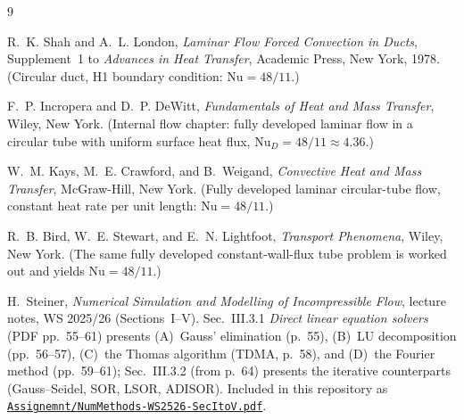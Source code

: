 \documentclass[12pt,a4paper]{article}
\begin{document}
\begin{thebibliography}{9}

R.~K. Shah and A.~L. London,
\emph{Laminar Flow Forced Convection in Ducts},
Supplement~1 to \emph{Advances in Heat Transfer}, Academic Press, New York, 1978.
(Circular duct, H1 boundary condition: $\text{Nu} = 48/11$.)

F.~P. Incropera and D.~P. DeWitt,
\emph{Fundamentals of Heat and Mass Transfer},
Wiley, New York.
(Internal flow chapter: fully developed laminar flow in a circular tube with uniform surface
heat flux, $\text{Nu}_D = 48/11 \approx 4.36$.)

W.~M. Kays, M.~E. Crawford, and B.~Weigand,
\emph{Convective Heat and Mass Transfer},
McGraw-Hill, New York.
(Fully developed laminar circular-tube flow, constant heat rate per unit length:
$\text{Nu} = 48/11$.)

R.~B. Bird, W.~E. Stewart, and E.~N. Lightfoot,
\emph{Transport Phenomena},
Wiley, New York.
(The same fully developed constant-wall-flux tube problem is worked out and yields
$\text{Nu} = 48/11$.)

H.~Steiner,
\emph{Numerical Simulation and Modelling of Incompressible Flow},
lecture notes, WS 2025/26 (Sections~I--V).
Sec.~III.3.1 \emph{Direct linear equation solvers} (PDF pp.~55--61) presents
(A)~Gauss' elimination (p.~55), (B)~LU decomposition (pp.~56--57), (C)~the Thomas
algorithm (TDMA, p.~58), and (D)~the Fourier method (pp.~59--61);
Sec.~III.3.2 (from p.~64) presents the iterative counterparts (Gauss--Seidel, SOR,
LSOR, ADISOR).
Included in this repository as
\href{../Assignemnt/NumMethods-WS2526-SecItoV.pdf}{\texttt{Assignemnt/NumMethods-WS2526-SecItoV.pdf}}.

\end{thebibliography}
\end{document}
